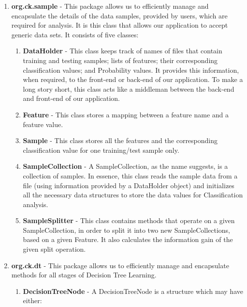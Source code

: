 \documentclass[conference]{IEEEtran}
\begin{document}
\begin{enumerate}
\item{\textbf{org.ck.sample}} - 
This package allows us to efficiently manage and encapsulate the details of the data samples, provided by users, which are required for analysis. It is this class that allows our application to accept generic data sets. It consists of five classes:

\begin{enumerate}
\item{\textbf{DataHolder}} - This class keeps track of names of files that contain training and testing samples; lists of features; their corresponding classification values; and Probability values. It provides this information, when required, to the front-end or back-end of our application. To make a long story short, this class acts like a middleman between the back-end and front-end of our application.
\item{\textbf{Feature}} - This class stores a mapping between a feature name and a feature value.

\item{\textbf{Sample}} - This class stores all the features and the corresponding classification value for one training/test sample only.  

\item{\textbf{SampleCollection}} - A SampleCollection, as the name suggests, is a collection of samples. In essence, this class reads the sample data from a file (using information provided by a DataHolder object) and initializes all the necessary data structures to store the data values for Classification analysis.

\item{\textbf{SampleSplitter}} - This class contains methods that operate on a given SampleCollection, in order to split it into two new SampleCollections, based on a given Feature. It also calculates the information gain of the given split operation.


\end{enumerate}




\item{\textbf{org.ck.dt}} - This package allows us to efficiently manage and encapsulate methods for all stages of Decision Tree Learning.

\begin{enumerate}

\item{\textbf{DecisionTreeNode}} - A DecisionTreeNode is a structure which may have either:


\end{enumerate}
\end{enumerate}
\end{document}
